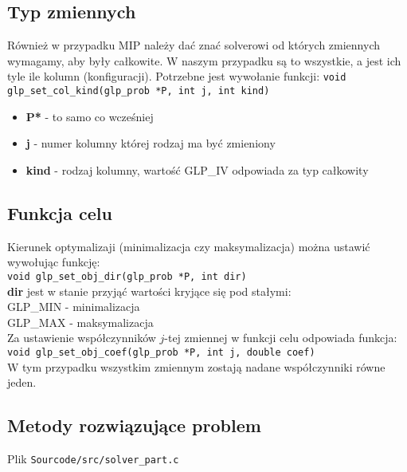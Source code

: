 \subsection{Typ zmiennych}\label{typ_zmiennych}
Również w przypadku MIP należy dać znać solverowi od których zmiennych wymagamy, aby były całkowite. W naszym przypadku są to wszystkie, a jest ich tyle ile kolumn (konfiguracji).
Potrzebne jest wywołanie funkcji:
\verb|void glp_set_col_kind(glp_prob *P, int j, int kind)|

\begin{itemize}
	\item \textbf{P*} - to samo co wcześniej
	\item \textbf{j} - numer kolumny której rodzaj ma być zmieniony
	\item \textbf{kind} - rodzaj kolumny, wartość GLP\_IV odpowiada za typ całkowity
\end{itemize}

\subsection{Funkcja celu}
Kierunek optymalizaji (minimalizacja czy maksymalizacja) można ustawić wywołując funkcję: \\
\verb|void glp_set_obj_dir(glp_prob *P, int dir)| \\
\textbf{dir} jest w stanie przyjąć wartości kryjące się pod stałymi: \\
GLP\_MIN - minimalizacja \\
GLP\_MAX - maksymalizacja \\

Za ustawienie współczynników $j$-tej zmiennej w funkcji celu odpowiada funkcja: \\
\verb|void glp_set_obj_coef(glp_prob *P, int j, double coef)| \\
W tym przypadku wszystkim zmiennym zostają nadane współczynniki równe jeden.

\subsection{Metody rozwiązujące problem}
{\parindent0pt
Plik \verb|Sourcode/src/solver_part.c|
}
